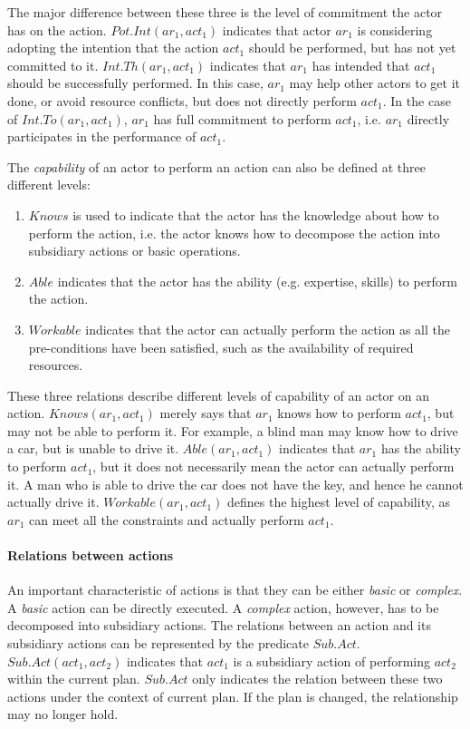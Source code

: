  The major difference between these three is the level of commitment the actor has on the action. $Pot.Int(ar_1, act_1)$ indicates that actor $ar_1$ is considering adopting the intention that the action $act_1$ should be performed, but has not yet committed to it. $Int.Th(ar_1, act_1)$ indicates that $ar_1$ has intended that $act_1$ should be successfully performed. In this case, $ar_1$ may help other actors to get it done, or avoid resource conflicts, but does not directly perform $act_1$. In the case of $Int.To(ar_1, act_1)$, $ar_1$ has full commitment to perform $act_1$, i.e. $ar_1$ directly participates in the performance of $act_1$.

The \emph{capability} of an actor to perform an action can also be defined at three different levels:

\begin{enumerate}
	\item $Knows$ is used to indicate that the actor has the knowledge about how to perform the action, i.e. the actor knows how to decompose the action into subsidiary actions or basic operations.
	\item $Able$ indicates that the actor has the ability (e.g. expertise, skills) to perform the action.
	\item $Workable$ indicates that the actor can actually perform the action as all the pre-conditions have been satisfied, such as the availability of required resources.
\end{enumerate}

These three relations describe different levels of capability of an actor on an action. $Knows(ar_1, act_1)$ merely says that $ar_1$ knows how to perform $act_1$, but may not be able to perform it. For example, a blind man may know how to drive a car, but is unable to drive it. $Able(ar_1, act_1)$ indicates that $ar_1$ has the ability to perform $act_1$, but it does not necessarily mean the actor can actually perform it. A man who is able to drive the car does not have the key, and hence he cannot actually drive it. $Workable(ar_1, act_1)$ defines the highest level of capability, as $ar_1$ can meet all the constraints and actually perform $act_1$.

\paragraph*{Relations between actions} %
\label{par:relations_between_actions}
An important characteristic of actions is that they can be either \emph{basic} or \emph{complex}. A \emph{basic} action can be directly executed. A \emph{complex} action, however, has to be decomposed into subsidiary actions. The relations between an action and its subsidiary actions can be represented by the predicate $Sub.Act$. $Sub.Act(act_1, act_2)$ indicates that $act_1$ is a subsidiary action of performing $act_2$ within the current plan. $Sub.Act$ only indicates the relation between these two actions under the context of current plan. If the plan is changed, the relationship may no longer hold.

